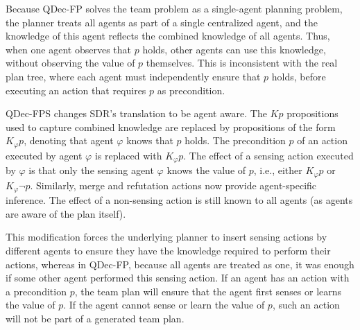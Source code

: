 \documentclass[letterpaper]{article} %
\newcommand\commentout[1]{}
\theoremstyle{definition}
\begin{document}
\commentout{ \guy{Commenting out the below, because it is relevant for the discussion of soundness and completeness, not agent specific knowledge}
If the agent models all possible states of the world, this mechanism is sound, that is, if the planner concludes that $Kp$ holds, then $p$ holds in the current belief state. It is also complete w.r.t.~literals and their conjunction. That is, if $Kp$ holds, the planner can deduce this fact using its inference actions.

Reasoning about the explicit set of possible worlds, which is often exponential, is impractical. Therefore, SDR sub-samples the set of possible worlds, and hence its reasoning is complete, but unsound. CPOR then fixes
this issue by performing regression before inserting any action into its plan, to verify that its preconditions hold in all possible worlds. Because regression is complete, this ensures the overall soundness of the planner.
}

Because QDec-FP solves the team problem as a single-agent planning problem, the planner treats all agents as part of a single centralized agent, and the knowledge of this agent reflects the combined knowledge of all agents. Thus, when one agent observes that $p$ holds, other agents can use this knowledge, without observing the value of $p$ themselves. This is inconsistent with the real plan tree, where each agent must independently ensure that $p$ holds, before executing an action that requires $p$ as precondition.

QDec-FPS changes SDR's translation to be agent aware.
The $Kp$ propositions used to capture combined knowledge
are replaced by propositions of the form $K_{\varphi}p$, denoting that agent $\varphi$ knows that $p$ holds. The precondition $p$ of an action executed by agent $\varphi$ is replaced with  $K_{\varphi}p$. The effect of a sensing action executed by $\varphi$ is that only the sensing agent $\varphi$ knows the value of $p$, i.e., either $K_{\varphi}p$ or $K_{\varphi}\neg p$.
Similarly, merge and refutation actions now provide  agent-specific inference. The effect of a non-sensing action is still known to all agents (as agents are aware of the plan itself).

This modification forces the underlying planner to insert sensing actions by different agents to ensure they have the knowledge required to perform their actions, whereas in QDec-FP, because all agents are treated as one, it was enough if some other agent performed this sensing action. If an agent has an action with a precondition $p$, the team plan will ensure that the agent first senses or learns the value of $p$.
If the agent cannot sense or learn the value of $p$, such an action will not be part of a generated team plan.
\end{document}
